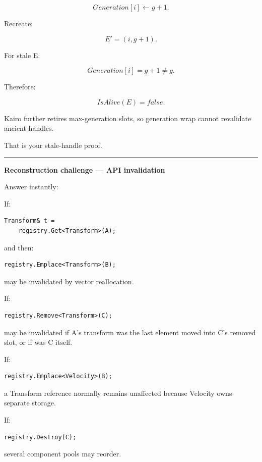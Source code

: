 \[
Generation[i]\leftarrow g+1.
\]

Recreate:

\[
E'=(i,g+1).
\]

For stale E:

\[
Generation[i]=g+1\neq g.
\]

Therefore:

\[
IsAlive(E)=false.
\]

Kairo further retires max-generation slots, so generation wrap cannot revalidate ancient handles.

That is your stale-handle proof.

\begin{center}\rule{0.5\linewidth}{0.5pt}\end{center}

\textbf{Reconstruction challenge --- API invalidation}

Answer instantly:

If:

\begin{verbatim}
Transform& t =
    registry.Get<Transform>(A);
\end{verbatim}

and then:

\begin{verbatim}
registry.Emplace<Transform>(B);
\end{verbatim}

 may be invalidated by vector reallocation.

If:

\begin{verbatim}
registry.Remove<Transform>(C);
\end{verbatim}

 may be invalidated if A's transform was the last element moved into C's removed slot, or if  was C itself.

If:

\begin{verbatim}
registry.Emplace<Velocity>(B);
\end{verbatim}

a Transform reference normally remains unaffected because Velocity owns separate storage.

If:

\begin{verbatim}
registry.Destroy(C);
\end{verbatim}

several component pools may reorder.

